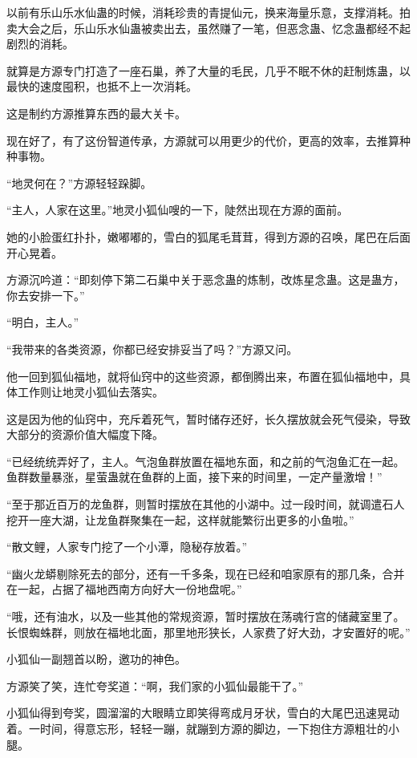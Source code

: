 \begin{this_body}
以前有乐山乐水仙蛊的时候，消耗珍贵的青提仙元，换来海量乐意，支撑消耗。拍卖大会之后，乐山乐水仙蛊被卖出去，虽然赚了一笔，但恶念蛊、忆念蛊都经不起剧烈的消耗。

就算是方源专门打造了一座石巢，养了大量的毛民，几乎不眠不休的赶制炼蛊，以最快的速度囤积，也抵不上一次消耗。

这是制约方源推算东西的最大关卡。

现在好了，有了这份智道传承，方源就可以用更少的代价，更高的效率，去推算种种事物。

“地灵何在？”方源轻轻跺脚。

“主人，人家在这里。”地灵小狐仙嗖的一下，陡然出现在方源的面前。

她的小脸蛋红扑扑，嫩嘟嘟的，雪白的狐尾毛茸茸，得到方源的召唤，尾巴在后面开心晃着。

方源沉吟道：“即刻停下第二石巢中关于恶念蛊的炼制，改炼星念蛊。这是蛊方，你去安排一下。”

“明白，主人。”

“我带来的各类资源，你都已经安排妥当了吗？”方源又问。

他一回到狐仙福地，就将仙窍中的这些资源，都倒腾出来，布置在狐仙福地中，具体工作则让地灵小狐仙去落实。

这是因为他的仙窍中，充斥着死气，暂时储存还好，长久摆放就会死气侵染，导致大部分的资源价值大幅度下降。

“已经统统弄好了，主人。气泡鱼群放置在福地东面，和之前的气泡鱼汇在一起。鱼群数量暴涨，星萤蛊就在鱼群的上面，接下来的时间里，一定产量激增！”

“至于那近百万的龙鱼群，则暂时摆放在其他的小湖中。过一段时间，就调遣石人挖开一座大湖，让龙鱼群聚集在一起，这样就能繁衍出更多的小鱼啦。”

“散文鲤，人家专门挖了一个小潭，隐秘存放着。”

“幽火龙蟒剔除死去的部分，还有一千多条，现在已经和咱家原有的那几条，合并在一起，占据了福地西南方向好大一份地盘呢。”

“哦，还有油水，以及一些其他的常规资源，暂时摆放在荡魂行宫的储藏室里了。长恨蜘蛛群，则放在福地北面，那里地形狭长，人家费了好大劲，才安置好的呢。”

小狐仙一副翘首以盼，邀功的神色。

方源笑了笑，连忙夸奖道：“啊，我们家的小狐仙最能干了。”

小狐仙得到夸奖，圆溜溜的大眼睛立即笑得弯成月牙状，雪白的大尾巴迅速晃动着。一时间，得意忘形，轻轻一蹦，就蹦到方源的脚边，一下抱住方源粗壮的小腿。


\end{this_body}
